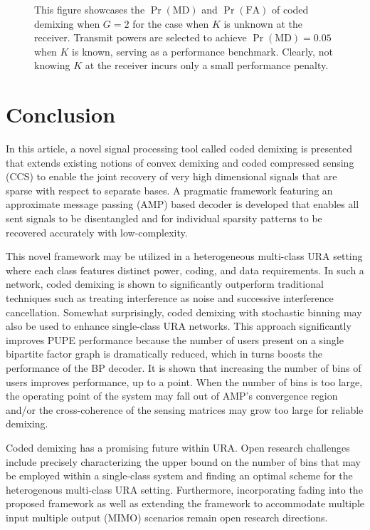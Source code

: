 \documentclass[journal]{IEEEtran}
\begin{document}
\begin{figure}
    \centering
    
    \caption{This figure showcases the $\Pr\left(\mathrm{MD}\right)$ and $\Pr\left(\mathrm{FA}\right)$ of coded demixing when $G = 2$ for the case when $K$ is unknown at the receiver. Transmit powers are selected to achieve $\Pr\left(\mathrm{MD}\right) = 0.05$ when $K$ is known, serving as a performance benchmark.
    Clearly, not knowing $K$ at the receiver incurs only a small performance penalty. }
    \label{fig:pe_unknown_k}
\end{figure}


\section{Conclusion}
\label{section:conclusion}

In this article, a novel signal processing tool called coded demixing is presented that extends existing notions of convex demixing and coded compressed sensing (CCS) to enable the joint recovery of very high dimensional signals that are sparse with respect to separate bases. 
A pragmatic framework featuring an approximate message passing (AMP) based decoder is developed that enables all sent signals to be disentangled and for individual sparsity patterns to be recovered accurately with low-complexity. 

This novel framework may be utilized in a heterogeneous multi-class URA setting where each class features distinct power, coding, and data requirements.  
In such a network, coded demixing is shown to significantly outperform traditional techniques such as treating interference as noise and successive interference cancellation. 
Somewhat surprisingly, coded demixing with stochastic binning may also be used to enhance single-class URA networks. 
This approach significantly improves PUPE performance because the number of users present on a single bipartite factor graph is dramatically reduced, which in turns boosts the performance of the BP decoder. 
It is shown that increasing the number of bins of users improves performance, up to a point. 
When the number of bins is too large, the operating point of the system may fall out of AMP's convergence region and/or the cross-coherence of the sensing matrices may grow too large for reliable demixing. 

Coded demixing has a promising future within URA. 
Open research challenges include precisely characterizing the upper bound on the number of bins that may be employed within a single-class system and finding an optimal scheme for the heterogenous multi-class URA setting. 
Furthermore, incorporating fading into the proposed framework as well as extending the framework to accommodate multiple input multiple output (MIMO) scenarios remain open research directions.
\end{document}
